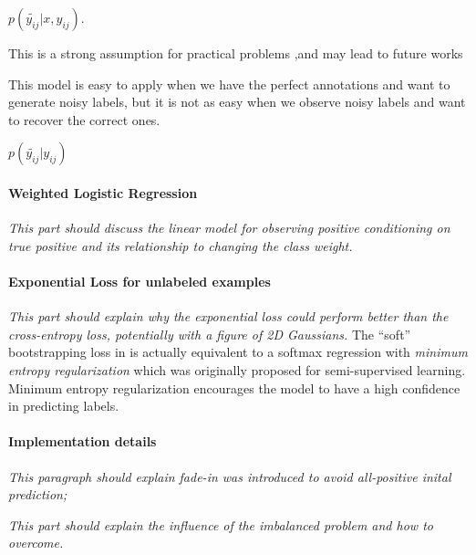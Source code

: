 $p(\tilde{y_{ij}} \vert x, y_{ij})$.

This is a strong assumption for practical problems
,and may lead to future works

This model is easy to apply when we have the perfect annotations and want to generate noisy labels, but it is not as easy when we observe noisy labels and want to recover the correct ones.

$p(\tilde{y_{ij}} \vert y_{ij})$


\paragraph{Weighted Logistic Regression}
\noindent \textit{This part should discuss the linear model for observing positive conditioning on true positive and its relationship to changing the class weight.}


\paragraph{Exponential Loss for unlabeled examples}
\noindent
\textit{This part should explain why the exponential loss could perform better than the cross-entropy loss, potentially with a figure of 2D Gaussians.}
The ``soft'' bootstrapping loss in \cite{reed2014training} is actually equivalent to a softmax regression with \textit{minimum entropy regularization}\cite{grandvalet2005semi} which was originally proposed for semi-supervised learning.
Minimum entropy regularization encourages the model to have a high confidence in predicting labels.


\paragraph{Implementation details}
\noindent \textit{This paragraph should explain fade-in was introduced to avoid all-positive inital prediction;}

\noindent

\noindent
\textit{This part should explain the influence of the imbalanced problem and how to overcome.}



